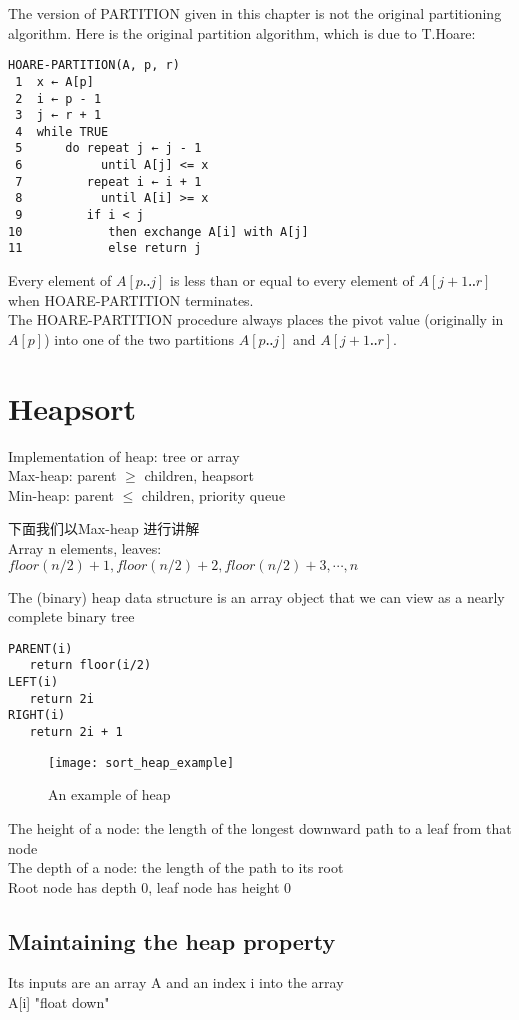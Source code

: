 \documentclass{article}
\begin{document}
The version of PARTITION given in this chapter is not the original partitioning algorithm. Here is the original partition algorithm, which is due to T.Hoare:
\begin{verbatim}
HOARE-PARTITION(A, p, r)
 1  x ← A[p]
 2  i ← p - 1
 3  j ← r + 1
 4  while TRUE
 5      do repeat j ← j - 1
 6           until A[j] <= x
 7         repeat i ← i + 1
 8           until A[i] >= x
 9         if i < j
10            then exchange A[i] with A[j]
11            else return j
\end{verbatim}
Every element of $A[p ‥ j]$ is less than or equal to every element of $A[j +1 ‥ r]$ when HOARE-PARTITION terminates.\\
The HOARE-PARTITION procedure always places the pivot value (originally in $A[p]$) into one of the two partitions $A[p ‥ j]$ and $A[j + 1 ‥ r]$.

\section{Heapsort}
Implementation of heap: tree or array\\
Max-heap: parent $\geq$ children,
	heapsort\\
Min-heap: parent $\leq$ children,
	priority queue

下面我们以Max-heap 进行讲解\\
Array n elements, leaves: $floor(n/2) + 1, floor(n/2) + 2, floor(n/2) + 3, \cdots, n$

The (binary) heap data structure is an array object that we can view as a nearly complete binary tree
\begin{verbatim}
PARENT(i)
   return floor(i/2)
LEFT(i)
   return 2i
RIGHT(i)
   return 2i + 1
\end{verbatim}

\begin{figure}[htbp]
  \centering
  \texttt{[image: sort\_heap\_example]}
  \caption{An example of heap}\label{fig.sort.heap.example}
\end{figure}

\noindent
The height of a node: the length of the longest downward path to a leaf from that node\\
The depth of a node: the length of the path to its root\\
Root node has depth 0, leaf node has height 0

\subsection{Maintaining the heap property}
Its inputs are an array A and an index i into the array\\
A[i] "float down"
\end{document}
